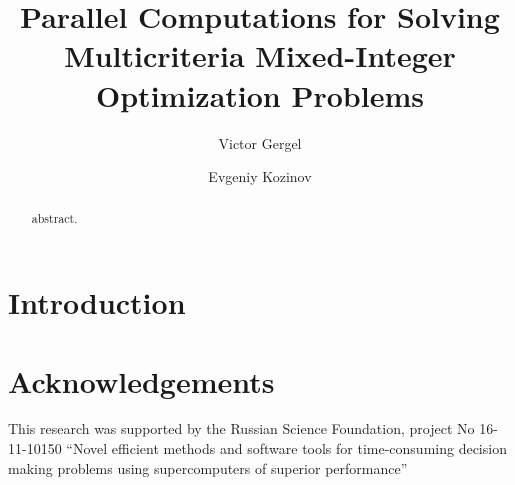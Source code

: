 \documentclass{svproc}
\begin{document}
\title{Parallel Computations for Solving Multicriteria Mixed-Integer Optimization Problems}

\author{Victor Gergel \and Evgeniy Kozinov}


\maketitle              %


\begin{abstract}
abstract.
\end{abstract}


\section{Introduction}\label{sec:1}

\cite{c1,c2,c3,c4,c5,c6,c7,c8,c9,c10}
\cite{c11,c12,c13,c14,c15,c16,c17,c18,c19,c20}
\cite{c21,c22,c23,c24,c25,c26,c27,c28,c29,c30}
\cite{c31,c32,c33,c34,c35,c36,c37,c38,c39,c40}
\cite{c41,c42,c43,c44,c45}



\section*{Acknowledgements} 
This research was supported by the Russian Science Foundation, project No 16-11-10150 ``Novel efficient methods and software tools for time-consuming decision making problems using supercomputers of superior performance''



%

\end{document}
